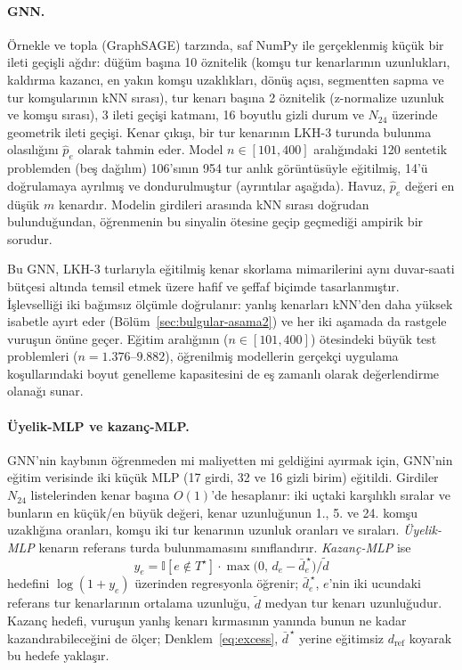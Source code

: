 \paragraph{GNN.} Örnekle ve topla (GraphSAGE) tarzında, saf NumPy ile gerçeklenmiş küçük bir
ileti geçişli ağdır: düğüm başına 10 öznitelik (komşu tur kenarlarının uzunlukları, kaldırma
kazancı, en yakın komşu uzaklıkları, dönüş açısı, segmentten sapma ve tur komşularının kNN
sırası), tur kenarı başına 2 öznitelik (z-normalize uzunluk ve komşu sırası), 3 ileti geçişi
katmanı, 16 boyutlu gizli durum ve $N_{24}$ üzerinde geometrik ileti geçişi. Kenar çıkışı, bir tur
kenarının LKH-3 \citep{helsgaun_2017_lkh3} turunda bulunma olasılığını $\hat p_e$ olarak tahmin eder.
Model $n\in[101,400]$ aralığındaki 120 sentetik problemden (beş dağılım) 106'sının 954 tur anlık
görüntüsüyle eğitilmiş, 14'ü doğrulamaya ayrılmış ve dondurulmuştur (ayrıntılar aşağıda). Havuz, $\hat p_e$ değeri en düşük $m$ kenardır. Modelin girdileri
arasında kNN sırası doğrudan bulunduğundan, öğrenmenin bu sinyalin ötesine geçip geçmediği ampirik
bir sorudur.

Bu GNN, LKH-3 turlarıyla eğitilmiş kenar skorlama mimarilerini aynı duvar-saati bütçesi altında
temsil etmek üzere hafif ve şeffaf biçimde tasarlanmıştır. İşlevselliği iki bağımsız ölçümle
doğrulanır: yanlış kenarları kNN'den daha yüksek isabetle ayırt eder (Bölüm~\ref{sec:bulgular-asama2})
ve her iki aşamada da rastgele vuruşun önüne geçer.
Eğitim aralığının ($n\in[101,400]$) ötesindeki büyük test problemleri ($n=1.376$--$9.882$),
öğrenilmiş modellerin gerçekçi uygulama koşullarındaki boyut genelleme kapasitesini de eş zamanlı
olarak değerlendirme olanağı sunar.

\paragraph{Üyelik-MLP ve kazanç-MLP.} GNN'nin kaybının öğrenmeden mi maliyetten mi geldiğini
ayırmak için, GNN'nin eğitim verisinde iki küçük MLP (17 girdi, 32 ve 16 gizli birim) eğitildi.
Girdiler $N_{24}$ listelerinden kenar başına $O(1)$'de hesaplanır: iki uçtaki karşılıklı sıralar ve
bunların en küçük/en büyük değeri, kenar uzunluğunun 1., 5. ve 24. komşu uzaklığına oranları,
komşu iki tur kenarının uzunluk oranları ve sıraları. \emph{Üyelik-MLP} kenarın referans turda
bulunmamasını sınıflandırır. \emph{Kazanç-MLP} ise
\[
  y_e=\mathbb{I}[e\notin T^\star]\cdot\max\bigl(0,\,d_e-\bar d^{\,\star}_e\bigr)/\tilde d
\]
hedefini $\log(1+y_e)$ üzerinden regresyonla öğrenir; $\bar d^{\,\star}_e$, $e$'nin iki ucundaki
referans tur kenarlarının ortalama uzunluğu, $\tilde d$ medyan tur kenarı uzunluğudur. Kazanç
hedefi, vuruşun yanlış kenarı kırmasının yanında bunun ne kadar kazandırabileceğini de ölçer;
Denklem~\eqref{eq:excess}, $\bar d^{\,\star}$ yerine eğitimsiz $d_{\mathrm{ref}}$ koyarak bu hedefe
yaklaşır.

